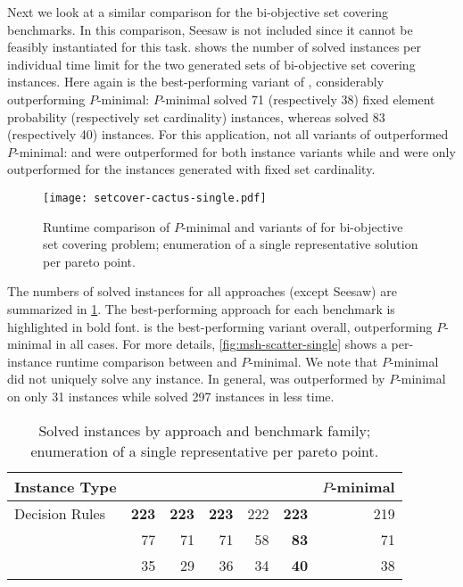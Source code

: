 Next we look at a similar comparison for the bi-objective set covering benchmarks.
In this comparison, Seesaw is not included since it cannot be feasibly instantiated for this task.
 shows the number of solved instances per individual time limit for the two generated sets of bi-objective set covering instances.
Here again \msh{} is the best-performing variant of \algname{}, considerably outperforming $P$-minimal:
$P$-minimal solved 71 (respectively 38) fixed element probability (respectively set cardinality) instances, whereas \msh{} solved 83 (respectively 40) instances.
For this application, not all variants of \algname{} outperformed $P$-minimal:
\msu{} and \oll{} were outperformed for both instance variants while \satunsat{} and \unsatsat{} were only outperformed for the instances generated with fixed set cardinality.

\begin{figure}
    \centering
    \texttt{[image: setcover-cactus-single.pdf]}
    \caption{Runtime comparison of $P$-minimal and variants of \algname{} for bi-objective set covering problem;
      enumeration of a single representative solution per pareto point.
    }\label{fig:setcover-cactus-single}
\end{figure}

The numbers of solved instances for all approaches (except Seesaw) are summarized in \cref{tab:nsolved-single}.
The best-performing approach for each benchmark is highlighted in bold font.
\msh{} is the best-performing \algname{} variant overall, outperforming $P$-minimal in all cases.
For more details, \cref{fig:msh-scatter-single} shows a per-instance runtime comparison between \msh{} and $P$-minimal.
We note that $P$-minimal did not uniquely solve any instance.
In general, \msh{} was outperformed by $P$-minimal on only 31 instances while \msh{} solved 297 instances in less time.

\begin{table}
  \centering
  \caption{Solved instances by approach and benchmark family;
    enumeration of a single representative per pareto point.
  }\label{tab:nsolved-single}
  \begin{tabular}{@{}lrrrrrr@{}}
    \toprule
    Instance Type & \satunsat{} & \unsatsat{} & \msu{} & \oll{} & \msh{} & $P$-minimal \\
    \midrule
    Decision Rules & \textbf{223} & \textbf{223} & \textbf{223} & 222 & \textbf{223} & 219 \\
    \scep{} & 77 & 71 & 71 & 58 & \textbf{83} & 71 \\
    \scsc{} & 35 & 29 & 36 & 34 & \textbf{40} & 38 \\
    \bottomrule
  \end{tabular}
\end{table}

